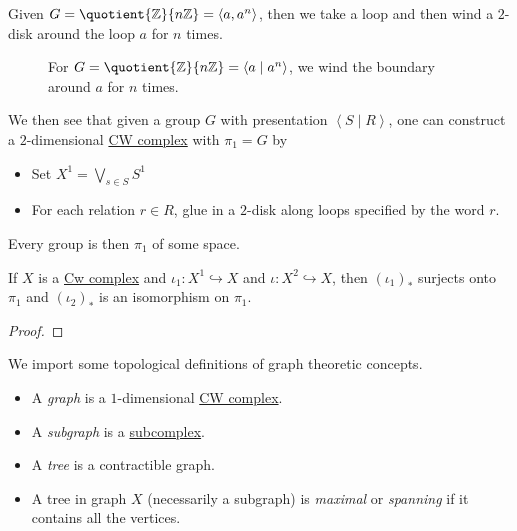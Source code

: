 \begin{eg}
	Given \(G = \quotient{\mathbb{\MakeUppercase{z}} }{n\mathbb{\MakeUppercase{z}} } = \left< a, a^n \right>  \), then we take a loop and then wind a \(2\)-disk
	around the loop \(a\) for \(n\) times.
	\begin{figure}[H]
		\centering
		\caption{For \(G = \quotient{\mathbb{\MakeUppercase{z}}}{n\mathbb{\MakeUppercase{z}} } = \left< a \mid a^n \right> \), we wind the boundary around \(a\) for \(n\) times.}
		\label{fig:lec12-eg}
	\end{figure}
\end{eg}

We then see that given a group \(G\) with presentation \(\left< S \mid R \right> \), one can construct a \(2\)-dimensional \hyperref[def:CW-Complex]{CW complex}
with \(\pi _1 = G\) by
\begin{itemize}
	\item Set \(X^1 = \bigvee_{s\in S} S^1\)
	\item For each relation \(r\in R\), glue in a \(2\)-disk along loops specified by the word \(r\).
\end{itemize}
Every group is then \(\pi _1\) of some space.

\begin{theorem}
	If \(X\) is a \hyperref[def:CW-Complex]{Cw complex} and \(\iota _1\colon X^1\hookrightarrow X\) and \(\iota \colon X^2\hookrightarrow X\),
	then \((\iota _1)_{\ast}\) surjects onto \(\pi _1\) and \((\iota _2)_{\ast}\) is an isomorphism on \(\pi _1\).
\end{theorem}
\begin{proof}
\end{proof}

\begin{definition}
	We import some topological definitions of graph theoretic concepts.
	\begin{itemize}
		\item A \emph{graph} is a \(1\)-dimensional \hyperref[def:CW-Complex]{CW complex}.
		\item A \emph{subgraph} is a \hyperref[def:CW-subcomplex]{subcomplex}.
		\item A \emph{tree} is a contractible graph.
		\item A tree in graph \(X\) (necessarily a subgraph) is \emph{maximal} or \emph{spanning} if it contains all the vertices.
	\end{itemize}
\end{definition}

